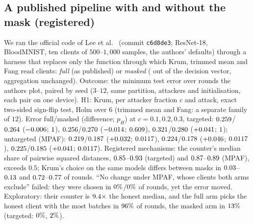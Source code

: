 \documentclass[journal]{IEEEtran}
\begin{document}
\subsection{A published pipeline with and without the mask (registered)}
\label{sup:r2}
We ran the official code of Lee et al.~\cite{lee2024triplet} (commit \texttt{c6d8de3}; ResNet-18,
BloodMNIST, ten clients of $500$--$1{,}000$ samples, the authors' defaults) through a harness that
replaces only the function through which Krum, trimmed mean and Fang read clients: \emph{full}
(as published) or \emph{masked} (\nbt{} out of the decision vector, aggregation unchanged).
Outcome: the minimum test error over rounds the authors plot, paired by seed ($3$--$12$, same
partition, attackers and initialisation, each pair on one device). H1: Krum, per attacker
fraction $c$ and attack, exact two-sided sign-flip test, Holm over $6$ (trimmed mean and Fang:
a separate family of $12$). Error full/masked (difference; $p_H$) at $c=0.1,0.2,0.3$, targeted:
$0.259$/$0.264$ ($-0.006$; $1$),
$0.256$/$0.270$ ($-0.014$; $0.609$),
$0.321$/$0.280$ ($+0.041$; $1$);
untargeted (MPAF): $0.219$/$0.187$ ($+0.032$; $0.0117$),
$0.224$/$0.178$ ($+0.046$; $0.0117$),
$0.225$/$0.185$ ($+0.041$; $0.0117$).
Registered mechanisms: the counter's median share of pairwise squared distances,
$0.85$--$0.93$ (targeted) and
$0.87$--$0.89$ (MPAF), exceeds $0.5$; Krum's choice on the same
models differs between masks in $0.03$--$0.13$ and
$0.72$--$0.77$ of rounds. ``No change under MPAF, whose clients both
arms exclude'' failed: they were chosen in $0\%$/$0\%$
of rounds, yet the error moved. Exploratory: their counter is $9.4\times$ the honest
median, and the full arm picks the honest client with the most batches in
$96\%$ of rounds, the masked arm in $13\%$ (targeted:
$0\%$, $2\%$).
\end{document}
